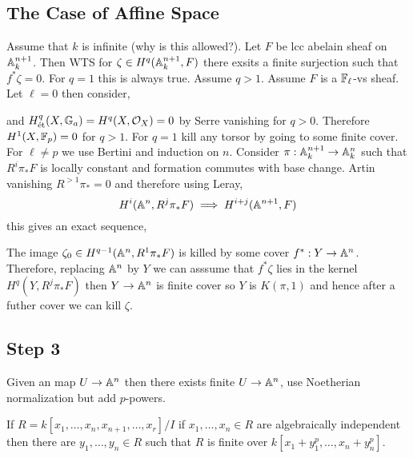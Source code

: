 \documentclass[12pt]{article}
\begin{document}
\subsection{The Case of Affine Space}

Assume that $k$ is infinite (why is this allowed?). Let $F$ be lcc abelain sheaf on $\mathbb{A}^{n+1}_k$. Then WTS for $\zeta \in H^q(\mathbb{A}_k^{n+1}, F)$ there exsits a finite \etale surjection such that $f^* \zeta = 0$. For $q = 1$ this is always true. Assume $q > 1$. Assume $F$ is a $\mathbb{F}_\ell$-vs sheaf. Let $\ell = 0$ then consider,
\begin{center}
\end{center}
and $H^q_{\text{\'{e}t}}(X, \mathbb{G}_a) = H^q(X, \mathcal{O}_{X}) = 0$ by Serre vanishing for $q > 0$. Therefore $H^1(X, \mathbb{F}_p) = 0$ for $q > 1$. For $q = 1$ kill any torsor by going to some finite \etale cover. 
\bigskip\\
For $\ell \neq p$ we use Bertini and induction on $n$. Consider $\pi : \mathbb{A}^{n+1}_k \to \mathbb{A}^n_k$ such that $R^i \pi_* F$ is locally constant and formation commutes with base change. Artin vanishing $R^{> 1} \pi_* = 0$ and therefore using Leray,
\[ H^i(\mathbb{A}^n, R^j \pi_* F) \implies H^{i+j}(\mathbb{A}^{n+1}, F) \]
this gives an exact sequence,
\begin{center}
The image $\zeta_0 \in H^{q-1}(\mathbb{A}^n, R^1 \pi_* F)$ is killed by some cover $f^* : Y \to \mathbb{A}^n$. Therefore, replacing $\mathbb{A}^n$ by $Y$ we can asssume that $f^* \zeta$ lies in the kernel $H^q(Y, R^j \pi_* F)$ then $Y \to \mathbb{A}^n$ is finite \etale cover so $Y$ is $K(\pi, 1)$ and hence after a futher cover we can kill $\zeta$.
\end{center}

\subsection{Step 3}

Given an \etale map $U \to \mathbb{A}^n$ then there exists finite \etale $U \to \mathbb{A}^n$, use Noetherian normalization but add $p$-powers. 

\begin{prop}
If $R = k[x_1, \dots, x_n, x_{n+1}, \dots, x_r] / I$ if $x_1, \dots, x_n \in R$ are algebraically independent then there are $y_1, \dots, y_n \in R$ such that $R$ is finite over $k[x_1 + y_1^p, \dots, x_n + y_n^p]$. 
\end{prop}
\end{document}
